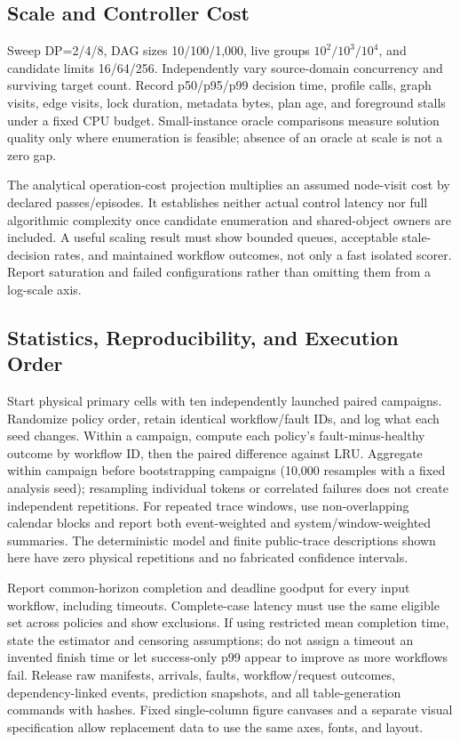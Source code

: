 \documentclass[sigplan,10pt,anonymous,nonacm]{acmart}
\begin{document}
\FloatBarrier
\subsection{Scale and Controller Cost}

Sweep DP=2/4/8, DAG sizes 10/100/1,000, live groups
$10^2/10^3/10^4$, and candidate limits 16/64/256. Independently vary
source-domain concurrency and surviving target count. Record p50/p95/p99
decision time, profile calls, graph visits, edge visits, lock duration,
metadata bytes, plan age, and foreground stalls under a fixed CPU budget.
Small-instance oracle comparisons measure solution quality only where
enumeration is feasible; absence of an oracle at scale is not a zero gap.

The analytical operation-cost projection multiplies an assumed node-visit cost by declared passes/episodes. It establishes neither actual control latency nor full
algorithmic complexity once candidate enumeration and shared-object
owners are included. A useful scaling result must show bounded queues,
acceptable stale-decision rates, and maintained workflow outcomes, not
only a fast isolated scorer. Report saturation and failed configurations
rather than omitting them from a log-scale axis.

\FloatBarrier
\subsection{Statistics, Reproducibility, and Execution Order}
\label{sec:eval-plan}

Start physical primary cells with ten independently launched paired
campaigns. Randomize policy order, retain identical workflow/fault IDs,
and log what each seed changes. Within a campaign, compute each policy's
fault-minus-healthy outcome by workflow ID, then the paired difference
against LRU. Aggregate within campaign before bootstrapping campaigns
(10,000 resamples with a fixed analysis seed); resampling individual
tokens or correlated failures does not create independent repetitions.
For repeated trace windows, use non-overlapping calendar blocks and
report both event-weighted and system/window-weighted summaries.
The deterministic model and finite public-trace descriptions shown here
have zero physical repetitions and no fabricated confidence intervals.

Report common-horizon completion and deadline goodput for every input
workflow, including timeouts. Complete-case latency must use the same
eligible set across policies and show exclusions. If using restricted
mean completion time, state the estimator and censoring assumptions;
do not assign a timeout an invented finish time or let success-only
p99 appear to improve as more workflows fail. Release raw manifests,
arrivals, faults, workflow/request outcomes, dependency-linked events,
prediction snapshots, and all table-generation commands with hashes.
Fixed single-column figure canvases and a separate visual specification
allow replacement data to use the same axes, fonts, and layout.
\end{document}
